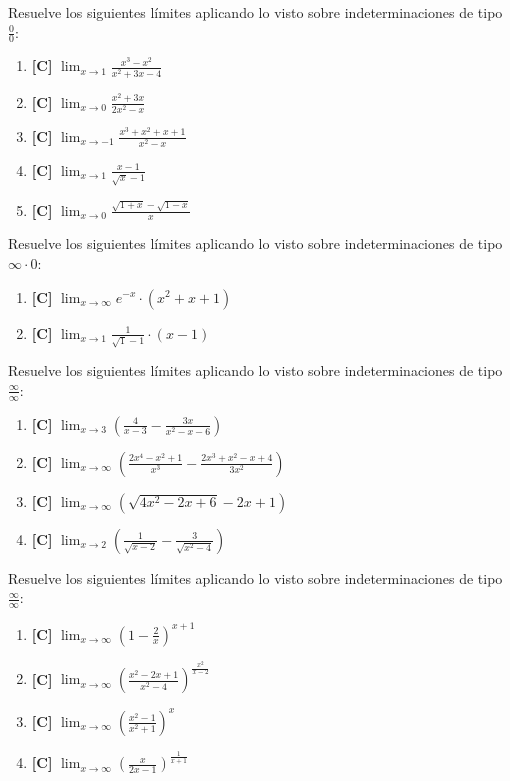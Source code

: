 \Exercicio Resuelve los siguientes límites aplicando lo visto sobre indeterminaciones de tipo $ \frac{0}{0} $:
\begin{enumerate}[topsep=0pt]
	\item \textbf{[C]} $ \lim_{x \to 1} \frac{x^3-x^2}{x^2+3x-4} $
	\item \textbf{[C]} $ \lim_{x \to 0} \frac{x^2+3x}{2x^2-x}  $
	\item \textbf{[C]} $ \lim_{x \to -1} \frac{x^3+x^2+x+1}{x^2-x}  $
	\item \textbf{[C]} $ \lim_{x \to 1} \frac{x-1}{\sqrt{x}-1}  $
	\item \textbf{[C]} $ \lim_{x \to 0} \frac{ \sqrt{1+x}-\sqrt{1-x}}{x} $
\end{enumerate}


\Exercicio Resuelve los siguientes límites aplicando lo visto sobre indeterminaciones de tipo $ \infty \cdot 0 $:
\begin{enumerate}[topsep=0pt]
	\item \textbf{[C]} $ \lim_{x \to \infty } e^{-x} \cdot (x^2 + x + 1) $
	\item \textbf{[C]} $ \lim_{x \to 1} \frac{1}{\sqrt{1} -1} \cdot (x-1) $
\end{enumerate}


\Exercicio Resuelve los siguientes límites aplicando lo visto sobre indeterminaciones de tipo $ \frac{\infty}{\infty} $:
\begin{enumerate}[topsep=0pt]
	\item \textbf{[C]} $ \lim_{x \to 3} (\frac{4}{x-3} - \frac{3x}{x^2-x-6}) $
	\item \textbf{[C]} $ \lim_{x \to \infty} ( \frac{2x^4-x^2+1}{x^3} - \frac{2x^3+x^2-x+4}{3x^2} ) $
	\item \textbf{[C]} $ \lim_{x \to \infty} (\sqrt{4x^2-2x+6} - 2x+1) $
	\item \textbf{[C]} $ \lim_{x \to 2} (\frac{1}{\sqrt{x-2}} - \frac{3}{\sqrt{x^2-4}}) $
\end{enumerate}


\Exercicio Resuelve los siguientes límites aplicando lo visto sobre indeterminaciones de tipo $ \frac{\infty}{\infty} $:
\begin{enumerate}[topsep=0pt]
	\item \textbf{[C]} $ \lim_{x \to \infty} (1 - \frac{2}{x})^{x+1} $
	\item \textbf{[C]} $ \lim_{x \to \infty} (\frac{x^2-2x+1}{x^2-4})^{\frac{x^2}{x-2}} $
	\item \textbf{[C]} $ \lim_{x \to \infty} (\frac{x^2-1}{x^2+1})^{x} $
	\item \textbf{[C]} $ \lim_{x \to \infty} (\frac{x}{2x-1})^{\frac{1}{x+1}} $
\end{enumerate}

